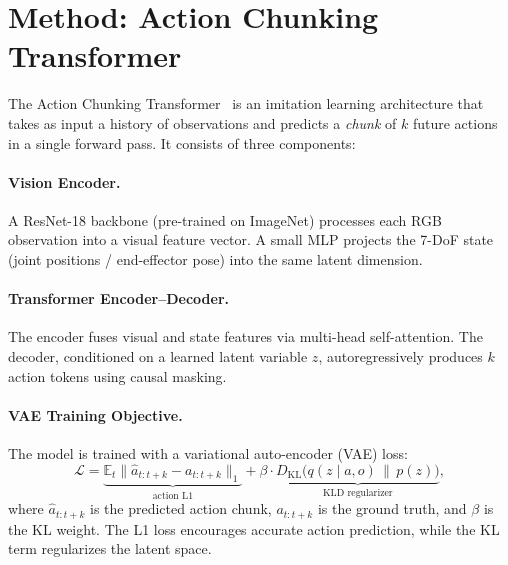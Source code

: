 \documentclass[twoside,twocolumn,10pt]{article}
\newcommand{\dataset}{CALVIN}
\begin{document}

\section{Method: Action Chunking Transformer}

The Action Chunking Transformer~\cite{zhao2023learning} is an imitation learning
architecture that takes as input a history of observations and predicts a
\emph{chunk} of $k$ future actions in a single forward pass.  It consists of
three components:

\paragraph{Vision Encoder.}
A ResNet-18 backbone (pre-trained on ImageNet) processes each RGB observation
into a visual feature vector.  A small MLP projects the 7-DoF state (joint
positions / end-effector pose) into the same latent dimension.

\paragraph{Transformer Encoder--Decoder.}
The encoder fuses visual and state features via multi-head self-attention.  The
decoder, conditioned on a learned latent variable $z$, autoregressively produces
$k$ action tokens using causal masking.

\paragraph{VAE Training Objective.}
The model is trained with a variational auto-encoder (VAE) loss:
\begin{equation}
\mathcal{L} = \underbrace{\mathbb{E}_{t} \| \hat{a}_{t:t+k} - a_{t:t+k} \|_1}_{\text{action L1}}
            + \beta \cdot \underbrace{D_{\mathrm{KL}}\bigl(q(z \mid a, o) \,\|\, p(z)\bigr)}_{\text{KLD regularizer}},
\label{eq:loss}
\end{equation}
where $\hat{a}_{t:t+k}$ is the predicted action chunk, $a_{t:t+k}$ is the ground
truth, and $\beta$ is the KL weight.  The L1 loss encourages accurate action
prediction, while the KL term regularizes the latent space.
\end{document}
